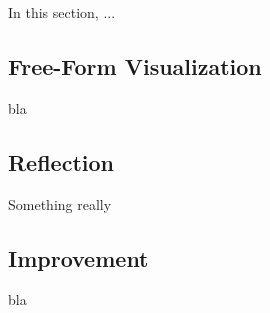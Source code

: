 \documentclass[a4paper]{article}
\begin{document}
In this section, ...

\subsection{Free-Form Visualization}

bla

\subsection{Reflection}

Something really \cite{Mohri_2012}

\subsection{Improvement}

bla




\end{document}
